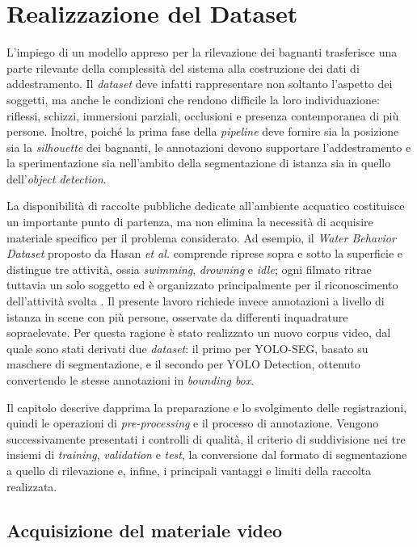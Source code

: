 \chapter{Realizzazione del Dataset}

L'impiego di un modello appreso per la rilevazione dei bagnanti trasferisce una parte rilevante della complessità del sistema alla costruzione dei dati di addestramento. Il \textit{dataset} deve infatti rappresentare non soltanto l'aspetto dei soggetti, ma anche le condizioni che rendono difficile la loro individuazione: riflessi, schizzi, immersioni parziali, occlusioni e presenza contemporanea di più persone. Inoltre, poiché la prima fase della \textit{pipeline} deve fornire sia la posizione sia la \textit{silhouette} dei bagnanti, le annotazioni devono supportare l'addestramento e la sperimentazione sia nell'ambito della segmentazione di istanza sia in quello dell'\textit{object detection}.

La disponibilità di raccolte pubbliche dedicate all'ambiente acquatico costituisce un importante punto di partenza, ma non elimina la necessità di acquisire materiale specifico per il problema considerato. Ad esempio, il \textit{Water Behavior Dataset} proposto da Hasan \textit{et al.} comprende riprese sopra e sotto la superficie e distingue tre attività, ossia \textit{swimming}, \textit{drowning} e \textit{idle}; ogni filmato ritrae tuttavia un solo soggetto ed è organizzato principalmente per il riconoscimento dell'attività svolta \cite{Hasan2021WaterDataset}. Il presente lavoro richiede invece annotazioni a livello di istanza in scene con più persone, osservate da differenti inquadrature sopraelevate. Per questa ragione è stato realizzato un nuovo corpus video, dal quale sono stati derivati due \textit{dataset}: il primo per YOLO-SEG, basato su maschere di segmentazione, e il secondo per YOLO Detection, ottenuto convertendo le stesse annotazioni in \textit{bounding box}.

Il capitolo descrive dapprima la preparazione e lo svolgimento delle registrazioni, quindi le operazioni di \textit{pre-processing} e il processo di annotazione. Vengono successivamente presentati i controlli di qualità, il criterio di suddivisione nei tre insiemi di \textit{training}, \textit{validation} e \textit{test}, la conversione dal formato di segmentazione a quello di rilevazione e, infine, i principali vantaggi e limiti della raccolta realizzata.

\section{Acquisizione del materiale video}

